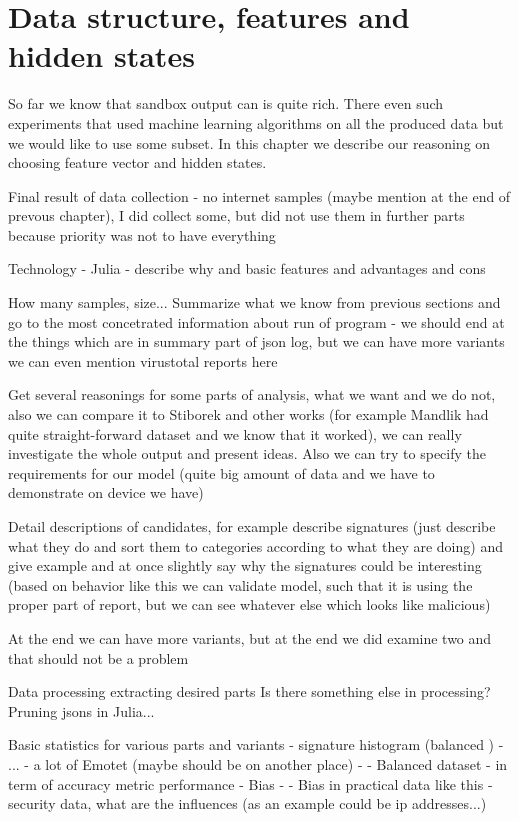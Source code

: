 \chapter{Data structure, features and hidden states}
So far we know that sandbox output can is quite rich. There even such experiments that used machine learning algorithms on all the produced data but we would like to use some subset. In this chapter we describe our reasoning on choosing feature vector and hidden states.

Final result of data collection - no internet samples (maybe mention at the end of prevous chapter), I did collect some, but did not use them in further parts because priority was not to have everything

Technology - Julia
  - describe why and basic features and advantages and cons


How many samples, size...
Summarize what we know from previous sections and go to the most concetrated information about run of program - we should end at the things which are in summary part of json log, but we can have more variants
we can even mention virustotal reports here

Get several reasonings for some parts of analysis, what we want and we do not, also we can compare it to Stiborek and other works (for example Mandlik had quite straight-forward dataset and we know that it worked), we can really investigate the whole output and present ideas. Also we can try to specify the requirements for our model (quite big amount of data and we have to demonstrate on device we have)


Detail descriptions of candidates, for example describe signatures (just describe what they do and sort them to categories according to what they are doing) and give example and at once slightly say why the signatures could be interesting (based on behavior like this we can validate model, such that it is using the proper part of report, but we can see whatever else which looks like malicious)

At the end we can have more variants, but at the end we did examine two and that should not be a problem

Data processing
extracting desired parts
Is there something else in processing?
Pruning jsons in Julia...

Basic statistics for various parts and variants
  - signature histogram (balanced )
  - ...
  - a lot of Emotet (maybe should be on another place)
  - - Balanced dataset - in term of accuracy metric performance
  - Bias - - Bias in practical data like this - security data, what are the influences (as an example could be ip addresses...)


